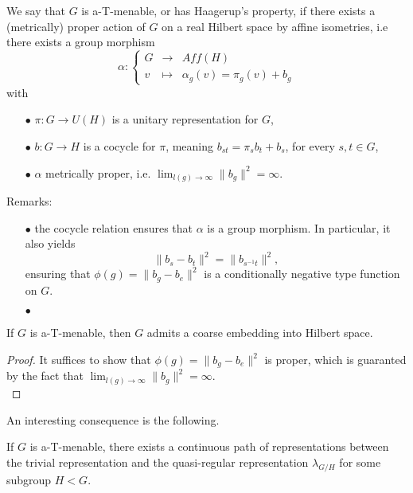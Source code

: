 \begin{definition} We say that $G$ is a-T-menable, or has Haagerup's property, if there exists a (metrically) proper action of $G$ on a real Hilbert space by affine isometries, i.e there exists a group morphism 
\[\alpha:\left\{\begin{array}{rcl} G & \rightarrow & Aff(H) \\ v & \mapsto & \alpha_g(v) = \pi_g(v)+b_g\end{array}\right.\] 
with 
\begin{itemize}
\item[$\bullet$] $\pi: G \rightarrow U(H)$ is a unitary representation for $G$,
\item[$\bullet$] $b: G\rightarrow H$ is a cocycle for $\pi$, meaning $b_{st} = \pi_s b_t+ b_s$, for every $s,t \in G$,
\item[$\bullet$] $\alpha$ metrically proper, i.e. $\lim_{l(g)\rightarrow \infty} \|b_g\|^2 =\infty$.
\end{itemize}
\end{definition}
Remarks:
\begin{itemize}
\item[$\bullet$] the cocycle relation ensures that $\alpha $ is a group morphism. In particular, it also yields 
\[ \|b_s- b_t\|^2 = \| b_{s^{-1}t} \|^2 ,\]
ensuring that $\phi(g)=\|b_g- b_e\|^2$ is a conditionally negative type function on $G$.
\item[$\bullet$] 
\end{itemize}

\begin{thm} If $G$ is a-T-menable, then $G$ admits a coarse embedding into Hilbert space.
\end{thm}
\begin{proof}
It suffices to show that $\phi(g)=\|b_g- b_e\|^2$ is proper, which is guaranted by the fact that $\lim_{l(g)\rightarrow \infty} \|b_g\|^2 =\infty$.\\
\end{proof}

An interesting consequence is the following. 
\begin{prop}
If $G$ is a-T-menable, there exists a continuous path of representations between the trivial representation and the quasi-regular representation $\lambda_{G/H}$ for some subgroup $H<G$.
\end{prop}


